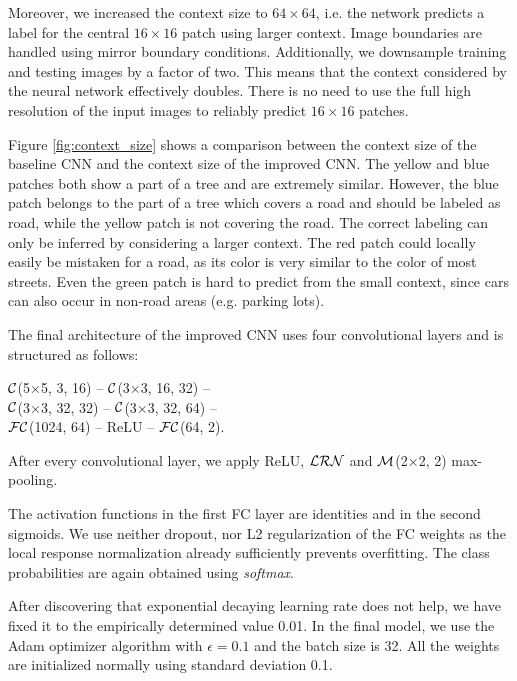 \documentclass[10pt,conference,compsocconf]{IEEEtran}
\newcommand{\conv}[3]{$ \cal{C} $(#1$ \times  $#1, #2, #3)}
\newcommand{\maxpool}[2]{$ \cal{M} $(#1$ \times $#1, #2)}
\newcommand{\lrn}{$ \cal{LRN}~$}
\newcommand{\fc}[2]{$ \cal{FC} $(#1, #2)}
\begin{document}
Moreover, we increased the context size to $ 64\times64 $, i.e. the network predicts a label for the central $ 16\times16 $ patch using larger context. Image boundaries are handled using mirror boundary conditions. Additionally, we downsample training and testing images by a factor of two. This means that the context considered by the neural network effectively doubles. There is no need to use the full high resolution of the input images to reliably predict $ 16 \times 16 $ patches.

\par
Figure \ref{fig:context_size} shows a comparison between the context size of the baseline CNN and the context size of the improved CNN. The yellow and blue patches both show a part of a tree and are extremely similar. However, the blue patch belongs to the part of a tree which covers a road and should be labeled as road, while the yellow patch is not covering the road. The correct labeling can only be inferred by considering a larger context. The red patch could locally easily be mistaken for a road, as its color is very similar to the color of most streets. Even the green patch is hard to predict from the small context, since cars can also occur in non-road areas (e.g. parking lots).

\par
The final architecture of the improved CNN uses four convolutional layers and is structured as follows:
\begin{center}
	\conv{5}{3}{16} -- \conv{3}{16}{32} -- \\ 
	\conv{3}{32}{32} -- \conv{3}{32}{64} -- \\
	\fc{1024}{64} -- ReLU -- \fc{64}{2}.
\end{center}
After every convolutional layer, we apply ReLU, \lrn and \maxpool{2}{2} max-pooling.

The activation functions in the first FC layer are identities and in the second sigmoids. We use neither dropout, nor L2 regularization of the FC weights as the local response normalization already sufficiently prevents overfitting. The class probabilities are again obtained using \textit{softmax}.

After discovering that exponential decaying learning rate does not help, we have fixed it to the empirically determined value 0.01. 
In the final model, we use the Adam optimizer algorithm \cite{Adam.2014} with $ \epsilon = 0.1 $ and the batch size is 32. All the weights are initialized normally using standard deviation 0.1.
\end{document}
